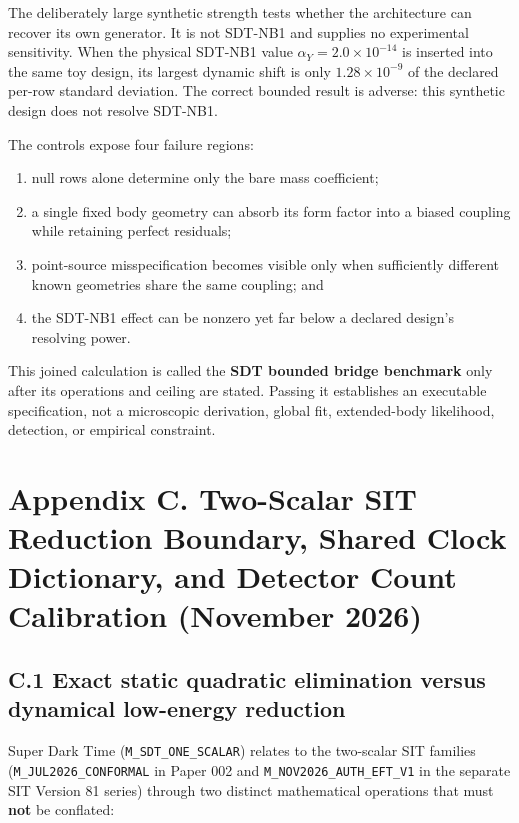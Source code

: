 \documentclass[
  american,
  11pt,
  letterpaper,
]{article}
\providecommand{\tightlist}{%
  \setlength{\itemsep}{0pt}\setlength{\parskip}{0pt}}
\begin{document}
The deliberately large synthetic strength tests whether the architecture can recover its own generator. It is not SDT-NB1 and supplies no experimental sensitivity. When the physical SDT-NB1 value \(\alpha_Y=2.0\times10^{-14}\) is inserted into the same toy design, its largest dynamic shift is only \(1.28\times10^{-9}\) of the declared per-row standard deviation. The correct bounded result is adverse: this synthetic design does not resolve SDT-NB1.

The controls expose four failure regions:

\begin{enumerate}
\def\labelenumi{\arabic{enumi}.}
\tightlist
\item
  null rows alone determine only the bare mass coefficient;
\item
  a single fixed body geometry can absorb its form factor into a biased coupling while retaining perfect residuals;
\item
  point-source misspecification becomes visible only when sufficiently different known geometries share the same coupling; and
\item
  the SDT-NB1 effect can be nonzero yet far below a declared design's resolving power.
\end{enumerate}

This joined calculation is called the \textbf{SDT bounded bridge benchmark} only after its operations and ceiling are stated. Passing it establishes an executable specification, not a microscopic derivation, global fit, extended-body likelihood, detection, or empirical constraint.

\section{Appendix C. Two-Scalar SIT Reduction Boundary, Shared Clock Dictionary, and Detector Count Calibration (November 2026)}\label{appendix-c.-two-scalar-sit-reduction-boundary-shared-clock-dictionary-and-detector-count-calibration-november-2026}

\subsection{C.1 Exact static quadratic elimination versus dynamical low-energy reduction}\label{c.1-exact-static-quadratic-elimination-versus-dynamical-low-energy-reduction}

Super Dark Time (\nolinkurl{M_SDT_ONE_SCALAR}) relates to the two-scalar SIT families (\nolinkurl{M_JUL2026_CONFORMAL} in Paper 002 and \nolinkurl{M_NOV2026_AUTH_EFT_V1} in the separate SIT Version 81 series) through two distinct mathematical operations that must \textbf{not} be conflated:
\end{document}
